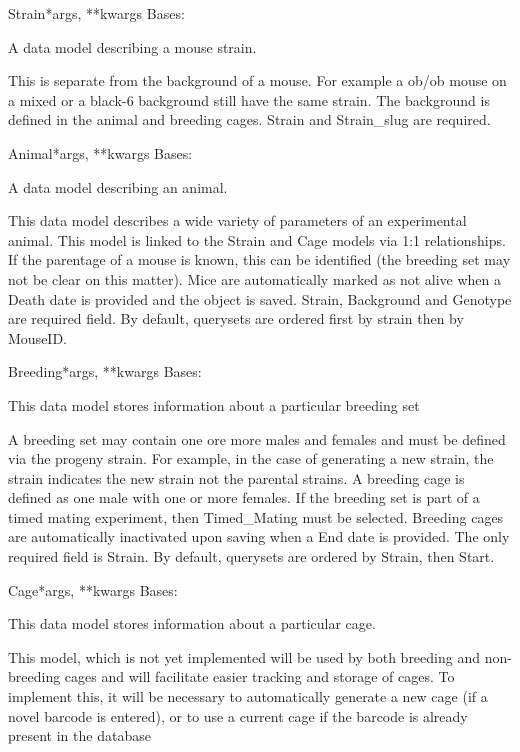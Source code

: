 \documentclass[letterpaper,10pt,english]{sphinxmanual}
\begin{document}
\hypertarget{animal.models.Strain}{}\begin{classdesc}{Strain}{*args, **kwargs}
Bases: 

A data model describing a mouse strain.

This is separate from the background of a mouse.  For example a ob/ob mouse on a mixed or a black-6 background still have the same strain.  The background is defined in the animal and breeding cages.  Strain and Strain\_slug are required.
\end{classdesc}

\hypertarget{animal.models.Animal}{}\begin{classdesc}{Animal}{*args, **kwargs}
Bases: 

A data model describing an animal.

This data model describes a wide variety of parameters of an experimental animal.  This model is linked to the Strain and Cage models via 1:1 relationships.  If the parentage of a mouse is known, this can be identified (the breeding set may not be clear on this matter). Mice are automatically marked as not alive when a Death date is provided and the object is saved.  Strain, Background and Genotype are required field.  By default, querysets are ordered first by strain then by MouseID.
\end{classdesc}

\hypertarget{animal.models.Breeding}{}\begin{classdesc}{Breeding}{*args, **kwargs}
Bases: 

This data model stores information about a particular breeding set

A breeding set may contain one ore more males and females and must be defined via the progeny strain.  For example, in the case of generating a new strain, the strain indicates the new strain not the parental strains.  A breeding cage is defined as one male with one or more females.  If the breeding set is part of a timed mating experiment, then Timed\_Mating must be selected.  Breeding cages are automatically inactivated upon saving when a End date is provided.  The only required field is Strain.  By default, querysets are ordered by Strain, then Start.
\end{classdesc}

\hypertarget{animal.models.Cage}{}\begin{classdesc}{Cage}{*args, **kwargs}
Bases: 

This data model stores information about a particular cage.

This model, which is not yet implemented will be used by both breeding and non-breeding cages and will facilitate easier tracking and storage of cages.  To implement this, it will be necessary to automatically generate a new cage (if a novel barcode is entered), or to use a current cage if the barcode is already present in the database
\end{classdesc}
\end{document}
